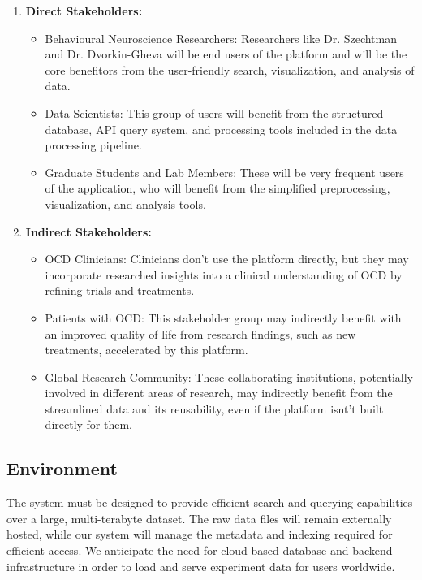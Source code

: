 \documentclass{article}
\begin{document}
\begin{enumerate}
  \item \textbf{Direct Stakeholders:}
  \begin{itemize}
    \item {Behavioural Neuroscience Researchers: Researchers like Dr. Szechtman and Dr. Dvorkin-Gheva will be 
    end users of the platform and will be the core benefitors from the user-friendly search, visualization, and analysis of data.}
    \item {Data Scientists: This group of users will benefit from the structured database, API query system, 
    and processing tools included in the data processing pipeline.}
    \item {Graduate Students and Lab Members: These will be very frequent users of the application, who will benefit from the simplified 
    preprocessing, visualization, and analysis tools.}
  \end{itemize}
  \item \textbf{Indirect Stakeholders:}
  \begin{itemize}
    \item {OCD Clinicians: Clinicians don't use the platform directly, but they may incorporate researched insights into 
    a clinical understanding of OCD by refining trials and treatments.}
    \item {Patients with OCD: This stakeholder group may indirectly benefit with an improved quality of life
     from research findings, such as new treatments, accelerated by this platform.}
    \item {Global Research Community: These collaborating institutions, potentially involved in different areas of research, 
    may indirectly benefit from the streamlined data and its reusability, even if the platform isnt't built directly for them.}
  \end{itemize}
\end{enumerate}

\subsection{Environment}


\par{
  The system must be designed to provide efficient search and querying capabilities over a large, multi-terabyte dataset. The raw data files will remain externally hosted, while our system will manage the metadata and indexing required for efficient access. We anticipate the need for cloud-based database and backend infrastructure in order to load and serve experiment data for users worldwide.  
}
\end{document}
